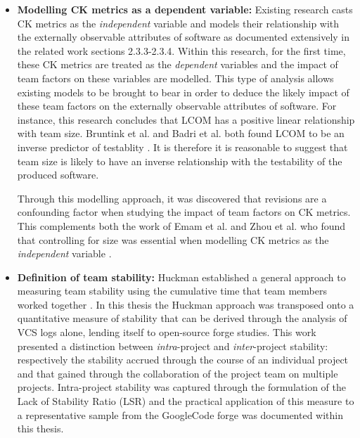 \begin{itemize}
\item  \textbf{Modelling CK metrics as a dependent variable: } Existing research casts CK metrics as the \textit{independent} variable and models their relationship with the externally observable attributes of software as documented extensively in the related work sections 2.3.3-2.3.4. Within this research, for the first time, these CK metrics are treated as the \textit{dependent} variables and the impact of team factors on these variables are modelled. This type of analysis allows existing models to be brought to bear in order to deduce the likely impact of these team factors on the externally observable attributes of software. For instance, this research concludes that LCOM has a positive linear relationship with team size. Bruntink et al. and Badri et al. both found LCOM to be an inverse predictor of testablity \citep{bruntink2006empirical, badri2011empirical}. It is therefore it is reasonable to suggest that team size is likely to have an inverse relationship with the testability of the produced software. 

Through this modelling approach, it was discovered that revisions are a confounding factor when studying the impact of team factors on CK metrics. This complements both the work of Emam et al. and Zhou et al. who found that controlling for size was essential when modelling CK metrics as the \textit{independent} variable  \citep{el2001prediction, zhou2006empirical}.

\item  \textbf{Definition of team stability: } Huckman established a general approach to measuring team stability using the cumulative time that team members worked together \citep{huckman2009team}. In this thesis the Huckman approach was transposed onto a quantitative measure of stability that can be derived through the analysis of VCS logs alone, lending itself to open-source forge studies. This work presented a distinction between \textit{intra}-project  and \textit{inter}-project stability: respectively the stability accrued through the course of an individual project and that gained through the collaboration of the project team on multiple projects. Intra-project stability was captured through the formulation of  the Lack of Stability Ratio (LSR) and the practical application of this measure to a representative sample from the GoogleCode forge was documented within this thesis.
\end{itemize}


